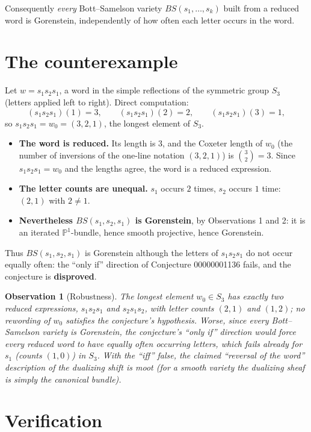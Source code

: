 \documentclass[11pt]{article}
\newtheorem{obs}{Observation}
\begin{document}
Consequently \emph{every} Bott--Samelson variety $BS(s_1,\dots,s_k)$ built from
a reduced word is Gorenstein, independently of how often each letter occurs in
the word.

\section{The counterexample}

Let $w = s_1s_2s_1$, a word in the simple reflections of the symmetric group
$S_3$ (letters applied left to right).  Direct computation:
\[
(s_1s_2s_1)(1) = 3,\qquad (s_1s_2s_1)(2) = 2,\qquad (s_1s_2s_1)(3) = 1,
\]
so $s_1s_2s_1 = w_0 = (3,2,1)$, the longest element of $S_3$.

\begin{itemize}
\item \textbf{The word is reduced.}  Its length is $3$, and the Coxeter length
of $w_0$ (the number of inversions of the one-line notation $(3,2,1)$) is
$\binom{3}{2} = 3$.  Since $s_1s_2s_1 = w_0$ and the lengths agree, the word is
a reduced expression.
\item \textbf{The letter counts are unequal.}  $s_1$ occurs $2$ times, $s_2$
occurs $1$ time: $(2,1)$ with $2 \neq 1$.
\item \textbf{Nevertheless $BS(s_1,s_2,s_1)$ is Gorenstein}, by Observations 1
and 2: it is an iterated $\mathbb{P}^1$-bundle, hence smooth projective, hence
Gorenstein.
\end{itemize}

Thus $BS(s_1,s_2,s_1)$ is Gorenstein although the letters of $s_1s_2s_1$ do not
occur equally often: the ``only if'' direction of Conjecture 00000001136 fails,
and the conjecture is \textbf{disproved}.

\begin{obs}[Robustness]
The longest element $w_0 \in S_3$ has exactly two reduced expressions,
$s_1s_2s_1$ and $s_2s_1s_2$, with letter counts $(2,1)$ and $(1,2)$; no
rewording of $w_0$ satisfies the conjecture's hypothesis.  Worse, since
\emph{every} Bott--Samelson variety is Gorenstein, the conjecture's ``only if''
direction would force every reduced word to have equally often occurring
letters, which fails already for $s_1$ (counts $(1,0)$) in $S_3$.  With the
``iff'' false, the claimed ``reversal of the word'' description of the dualizing
shift is moot (for a smooth variety the dualizing sheaf is simply the canonical
bundle).
\end{obs}

\section{Verification}
\end{document}

